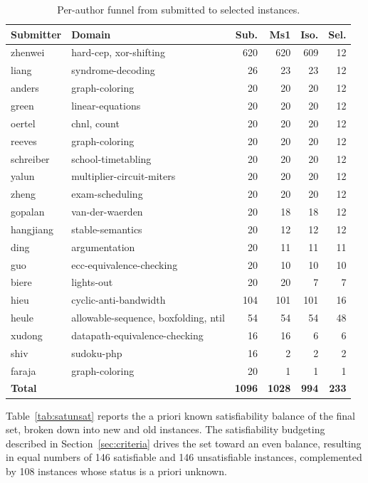 \documentclass[conference]{IEEEtran}
\begin{document}
\begin{table}
\caption{Per-author funnel from submitted to selected instances.}
\centering
\setlength{\tabcolsep}{3pt}
\begin{tabularx}{.48\textwidth}{lXrrrr}
\textbf{Submitter} & \textbf{Domain} & \textbf{Sub.} & \textbf{Ms1} & \textbf{Iso.} & \textbf{Sel.} \\
\hline
zhenwei & hard-cep, xor-shifting & 620 & 620 & 609 & 12 \\
liang & syndrome-decoding & 26 & 23 & 23 & 12 \\
anders & graph-coloring & 20 & 20 & 20 & 12 \\
green & linear-equations & 20 & 20 & 20 & 12 \\
oertel & chnl, count & 20 & 20 & 20 & 12 \\
reeves & graph-coloring & 20 & 20 & 20 & 12 \\
schreiber & school-timetabling & 20 & 20 & 20 & 12 \\
yalun & multiplier-circuit-miters & 20 & 20 & 20 & 12 \\
zheng & exam-scheduling & 20 & 20 & 20 & 12 \\
gopalan & van-der-waerden & 20 & 18 & 18 & 12 \\
hangjiang & stable-semantics & 20 & 12 & 12 & 12 \\
ding & argumentation & 20 & 11 & 11 & 11 \\
guo & ecc-equivalence-checking & 20 & 10 & 10 & 10 \\
biere & lights-out & 20 & 20 & 7 & 7 \\
\hline
hieu & cyclic-anti-bandwidth & 104 & 101 & 101 & 16 \\
heule & allowable-sequence, boxfolding, ntil & 54 & 54 & 54 & 48 \\
xudong & datapath-equivalence-checking & 16 & 16 & 6 & 6 \\
shiv & sudoku-php & 16 & 2 & 2 & 2 \\
faraja & graph-coloring & 20 & 1 & 1 & 1 \\
\hline
\textbf{Total} & & \textbf{1096} & \textbf{1028} & \textbf{994} & \textbf{233} \\
\end{tabularx}
\label{tab:submissions}
\end{table}

Table~\ref{tab:satunsat} reports the a priori known satisfiability balance of the final set, broken down into new and old instances.
The satisfiability budgeting described in Section~\ref{sec:criteria} drives the set toward an even balance, resulting in equal numbers of 146 satisfiable and 146 unsatisfiable instances, complemented by 108 instances whose status is a priori unknown.
\end{document}
